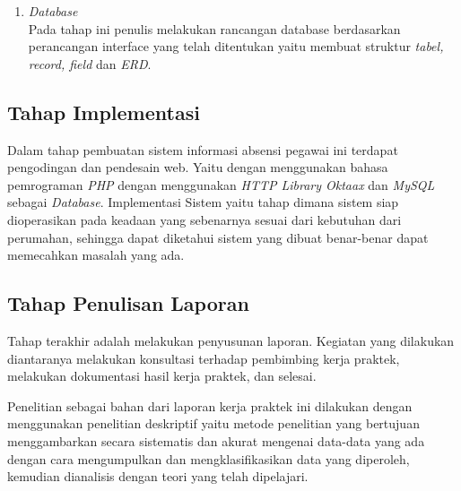 \begin{enumerate}
\begin{enumerate} [label=\alph*.]
		\item Perancangan \textit{interface} halaman kontak.
		\item Perancangan \textit{interface} halaman \textit{login}
		\item Perancangan \textit{interface} halaman \textit{booking}
		\item Perancangan \textit{interface} halaman \textit{Dashboard}
	\end{enumerate}
	\item \textit{Database}\\Pada tahap ini penulis melakukan rancangan database berdasarkan perancangan interface yang telah ditentukan yaitu membuat struktur \textit{tabel, record, field} dan \textit{ERD}.
\end{enumerate}
\subsection{Tahap Implementasi}
Dalam tahap pembuatan sistem informasi absensi pegawai ini terdapat pengodingan dan pendesain web. Yaitu dengan menggunakan bahasa pemrograman \textit{PHP} dengan menggunakan \textit{HTTP Library Oktaax} dan \textit{MySQL} sebagai \textit{Database}. Implementasi Sistem yaitu tahap dimana sistem siap dioperasikan pada keadaan yang sebenarnya sesuai dari kebutuhan dari perumahan, sehingga dapat diketahui sistem yang dibuat benar-benar dapat memecahkan masalah yang ada.
\subsection{Tahap Penulisan Laporan}
\par Tahap terakhir adalah melakukan penyusunan laporan. Kegiatan yang dilakukan diantaranya melakukan konsultasi terhadap pembimbing kerja praktek, melakukan dokumentasi hasil kerja praktek, dan selesai.
\par Penelitian sebagai bahan dari laporan kerja praktek ini dilakukan dengan menggunakan penelitian deskriptif yaitu metode penelitian yang bertujuan menggambarkan secara sistematis dan akurat mengenai data-data yang ada dengan cara mengumpulkan dan mengklasifikasikan data yang diperoleh, kemudian dianalisis dengan teori yang telah dipelajari.

